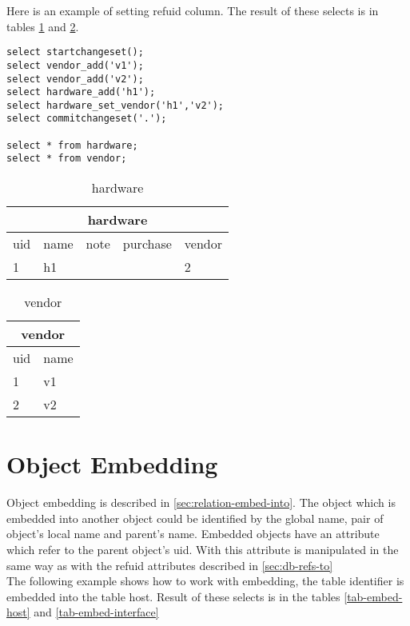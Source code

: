 \documentclass[deska]{subfiles}
\begin{document}
Here is an example of setting refuid column. The result of these selects is in tables \ref{tab-refs-hardware} and  \ref{tab-refs-vendor}.
\begin{verbatim}
select startchangeset();
select vendor_add('v1');
select vendor_add('v2');
select hardware_add('h1');
select hardware_set_vendor('h1','v2');
select commitchangeset('.');

select * from hardware;
select * from vendor;
\end{verbatim}

\begin{center}

\begin{table}
    \caption{hardware}
    \label{tab-refs-hardware}
\begin{tabular}{ | l | l | l | l | l |}
    \hline
    \multicolumn{5}{|c|}{hardware}\\
    \hline
    uid & name & note & purchase & vendor\\
    \hline
    1 & h1 &  &  & 2\\
    \hline
\end{tabular}
\end{table}

\begin{table}
    \caption{vendor}
    \label{tab-refs-vendor}
\begin{tabular}{ | l | l |}
    \hline
    \multicolumn{2}{|c|}{vendor}\\
    \hline
    uid & name \\
    \hline
    1 & v1\\
    2 & v2\\
    \hline
\end{tabular}
\end{table}

\end{center}

\section{Object Embedding}
Object embedding is described in \ref{sec:relation-embed-into}. The object which is embedded into another object could be identified by the global name, pair of object's local name and parent's name. Embedded objects have an attribute which refer to the parent object's uid. With this attribute is manipulated in the same way as with the refuid attributes described in \ref{sec:db-refs-to}\\
The following example shows how to work with embedding, the table identifier is embedded into the table host. Result of these selects is in the tables \ref{tab-embed-host} and \ref{tab-embed-interface}
\end{document}
